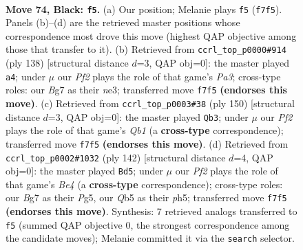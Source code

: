 \documentclass[11pt]{article}
\begin{document}
\clearpage

\begin{figure}[p]\centering
\begin{subfigure}{0.46\textwidth}\centering
\resizebox{\linewidth}{!}{%
\newchessgame
\chessboard[
  setfen={8/2k2pb1/8/1q6/8/7K/8/8 b - - 3 74},
  showmover=false,
  pgfstyle=straightmove, color=movearrow, markmove={f7-f5}
]}
\caption{}
\end{subfigure}\hfill
\begin{subfigure}{0.46\textwidth}\centering
\resizebox{\linewidth}{!}{%
\newchessgame
\chessboard[
  setfen={7Q/k7/8/6K1/8/P3n3/8/8 w - - 1 70},
  showmover=false,
  pgfstyle=straightmove, color=movearrow, markmove={a3-a4}
]}
\caption{}
\end{subfigure}
\\[4pt]
\begin{subfigure}{0.46\textwidth}\centering
\resizebox{\linewidth}{!}{%
\newchessgame
\chessboard[
  setfen={8/6K1/8/k7/8/4B3/8/1Q6 w - - 1 76},
  showmover=false,
  pgfstyle=straightmove, color=movearrow, markmove={b1-b3}
]}
\caption{}
\end{subfigure}\hfill
\begin{subfigure}{0.46\textwidth}\centering
\resizebox{\linewidth}{!}{%
\newchessgame
\chessboard[
  setfen={7k/2b5/8/6Pp/4B3/8/8/5K2 w - - 16 72},
  showmover=false,
  pgfstyle=straightmove, color=movearrow, markmove={e4-d5}
]}
\caption{}
\end{subfigure}
\caption{\textbf{Move 74, Black: \texttt{f5}.} (a) Our position; Melanie plays \texttt{f5} (\texttt{f7f5}). Panels (b)--(d) are the retrieved master positions whose correspondence most drove this move (highest QAP objective among those that transfer to it). (b) Retrieved from \texttt{ccrl\_top\_p0000\#914} (ply 138) [structural distance $d$=3, QAP obj=0]: the master played \texttt{a4}; under $\mu$ our \emph{Pf2} plays the role of that game's \emph{Pa3}; cross-type roles: our \emph{B}g7 as their \emph{n}e3; transferred move \texttt{f7f5} \textbf{(endorses this move)}. (c) Retrieved from \texttt{ccrl\_top\_p0003\#38} (ply 150) [structural distance $d$=3, QAP obj=0]: the master played \texttt{Qb3}; under $\mu$ our \emph{Pf2} plays the role of that game's \emph{Qb1} (a \textbf{cross-type} correspondence); transferred move \texttt{f7f5} \textbf{(endorses this move)}. (d) Retrieved from \texttt{ccrl\_top\_p0002\#1032} (ply 142) [structural distance $d$=4, QAP obj=0]: the master played \texttt{Bd5}; under $\mu$ our \emph{Pf2} plays the role of that game's \emph{Be4} (a \textbf{cross-type} correspondence); cross-type roles: our \emph{B}g7 as their \emph{P}g5, our \emph{Q}b5 as their \emph{p}h5; transferred move \texttt{f7f5} \textbf{(endorses this move)}. Synthesis: 7 retrieved analogs transferred to \texttt{f5} (summed QAP objective 0, the strongest correspondence among the candidate moves); Melanie committed it via the \texttt{search} selector.}
\label{fig:thought-m147}
\end{figure}
\end{document}
